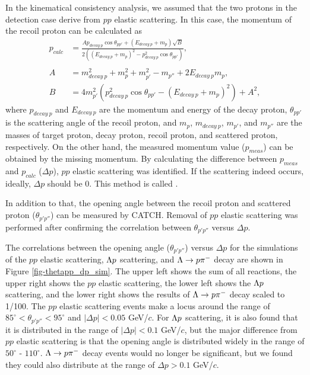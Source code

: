 In the kinematical consistency analysis, we assumed that the two protons in the detection case  derive from $pp$ elastic scattering. In this case, the momentum of the recoil proton can be calculated as
\begin{align}
  p_{calc} &= \frac{A p_{decay\ p} \cos{\theta_{pp'}} + (E_{decay\ p} + m_{p}) \sqrt{B}}{2((E_{decay\ p} + m_{p})^{2} - p^{2}_{decay\ p} \cos{\theta_{pp'}})}, \\
  \nonumber \\
  A &= m^{2}_{decay\ p} + m^{2}_{p} + m^{2}_{p'} - m_{p''} + 2 E_{decay\ p} m_{p}, \\
  B &= 4 m^{2}_{p'} ( p^{2}_{decay\ p} \cos{\theta_{pp'}} - (E_{decay\ p} + m_{p})^{2} ) + A^{2},
\end{align}
where $p_{decay\ p}$ and $E_{decay\ p}$ are the momentum and energy of the decay proton, $\theta_{pp'}$ is the scattering angle of the recoil proton, and $m_{p}$, $m_{decay\ p}$, $m_{p'}$, and $m_{p''}$ are the masses of target proton, decay proton, recoil proton, and scattered proton, respectively. On the other hand, the measured momentum value ($p_{meas}$) can be obtained by the missing momentum. 
By calculating the difference between $p_{meas}$ and $p_{calc}$ ($\Delta p$), $pp$ elastic scattering was identified. If the scattering indeed occurs, ideally, $\Delta p$ should be 0. This method is called . 

In addition to that, the opening angle between the recoil proton and scattered proton ($\theta_{p'p''}$) can be measured by CATCH. Removal of $pp$ elastic scattering was performed after confirming the correlation between $\theta_{p'p''}$ versus $\Delta p$.

The correlations between the opening angle ($\theta_{p'p''}$) versus $\Delta p$ for the simulations of the $pp$ elastic scattering, $\Lambda p$ scattering, and $\Lambda\to p\pi^{-}$ decay are shown in Figure \ref{fig-thetapp_dp_sim}. The upper left shows the sum of all reactions, the upper right shows the $pp$ elastic scattering, the lower left shows the $\Lambda p$ scattering, and the lower right shows the results of $\Lambda\to p\pi^{-}$ decay scaled to 1/100. The $pp$ elastic scattering events make a locus around the range of $85^{\circ}<\theta_{p'p''}<95^{\circ}$ and $|\Delta p|<0.05$ GeV/$c$. For $\Lambda p$ scattering, it is also found that it is distributed in the range of $|\Delta p|<0.1$ GeV/$c$, but the major difference from $pp$ elastic scattering is that the opening angle is distributed widely in the range of $50^{\circ}$ - $110^{\circ}$. $\Lambda\to p\pi^{-}$ decay events would no longer be significant, but we found they could also distribute at the range of $\Delta p>0.1$ GeV/$c$. 


